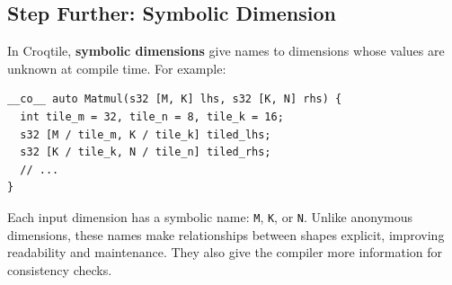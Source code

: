\subsection*{Step Further: \textbf{Symbolic Dimension}}

In Croqtile, \textbf{symbolic dimensions} give names to dimensions whose values are unknown at compile time. For example:

\begin{lstlisting}[language=croqtile,caption={Step Further: Symbolic Dimension}]
__co__ auto Matmul(s32 [M, K] lhs, s32 [K, N] rhs) {
  int tile_m = 32, tile_n = 8, tile_k = 16;
  s32 [M / tile_m, K / tile_k] tiled_lhs;
  s32 [K / tile_k, N / tile_n] tiled_rhs;
  // ...
}
\end{lstlisting}

Each input dimension has a symbolic name: \texttt{M}, \texttt{K}, or \texttt{N}. Unlike anonymous dimensions, these names make relationships between shapes explicit, improving readability and maintenance. They also give the compiler more information for consistency checks.
